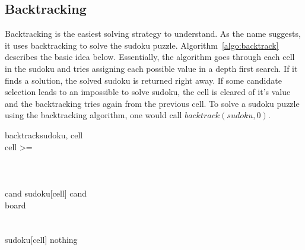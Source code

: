     \subsection{Backtracking}
    Backtracking is the easiest solving strategy to understand. As the name suggests, it uses backtracking to solve the sudoku puzzle.
    Algorithm~\ref{algo:backtrack} describes the basic idea below. Essentially, the algorithm goes through each cell in the sudoku and
    tries assigning each possible value in a depth first search. If it finds a solution, the solved sudoku is returned right away. If
    some candidate selection leads to an impossible to solve sudoku, the cell is cleared of it's value and the backtracking tries again
    from the previous cell. To solve a sudoku puzzle using the backtracking algorithm, one would call $backtrack(sudoku, 0)$.
    \begin{center}
    \begin{pseudocode}[framebox]{backtrack}{sudoku, cell}
                                 \\
        \IF cell >=  \THEN {} \\
         \\
        \IF {} \THEN
                                      \\
           \\
        \FOREACH cand \in {} \DO \BEGIN
            sudoku[cell] \GETS cand                                     \\
            board \GETS {}              \\
            \IF {} \THEN {}            \\
        \END                                                            \\
        sudoku[cell] \GETS nothing                                      \\
        ~
        \label{algo:backtrack}
    \end{pseudocode}
    \end{center}
    
